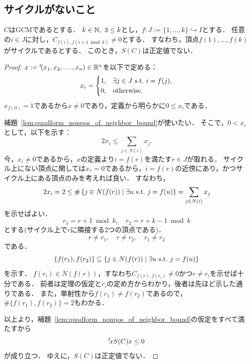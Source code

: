 \subsection{サイクルがないこと}

\begin{theorem}
  \label{thm:no_cycle}
  \leanok
  \uses{}
  $C$はGCMであるとする．
  $k \in \mathbb{N},\ 3 \le k$とし，$f : J := \{1, \ldots, k\} \hookrightarrow I$とする．
  任意の$i \in J$に対し，$C_{f(i), f(i+1 \bmod k)} \ne 0$とする．
  すなわち，頂点$f(1), \ldots, f(k)$がサイクルであるとする．
  このとき，$S(C)$は正定値でない．
\end{theorem}

\begin{proof}
  $x := {}^t\!(x_1, x_2, \ldots, x_n) \in \mathbb{R}^n$を以下で定める：
  \begin{equation}
    x_i = \begin{cases}
      1, & \exists j \in J \ \text{s.t.}\  i = f(j),\\
      0, & \textrm{otherwise}.
    \end{cases}
  \end{equation}
  $x_{f(0)} = 1$であるから$x \ne 0$であり，定義から明らかに$0 \le x_i$である．

  補題~\ref{lem:quadform_nonpos_of_neighbor_bound}が使いたい．
  そこで，$0 < x_i$として，以下を示す：
  \begin{equation}
    2 x_i \le \sum_{j \in N(i)} x_j.
  \end{equation}
  今，$x_i \ne 0$であるから，$x$の定義より$i = f(r)$を満たす$r \in J$が取れる．
  サイクル上にない頂点に関しては$x_* = 0$であるから，$i = f(r)$の近傍にあり，かつサイクル上にある頂点のみを考えれば良い．
  すなわち，
  \begin{equation}
    2 x_i
    = 2
    \le \#\left\lbrace j \in N(f(r)) \mathrel{} \middle| \mathrel{} \exists u \ \text{s.t.}\  j = f(u) \right\rbrace
    = \sum_{j \in N(i)} x_j
  \end{equation}
  を示せばよい．
  \begin{equation}
    r_1 = r + 1 \bmod k,\quad r_2 = r + k - 1 \bmod k
  \end{equation}
  とする(サイクル上で$r$に隣接する2つの頂点である)．
  \begin{equation}
    r \ne r_1,\quad r \ne r_2,\quad r_1 \ne r_2
  \end{equation}
  である．
  \begin{equation}
    \{f(r_1), f(r_2)\} \subseteq \left\lbrace j \in N(f(r)) \mathrel{} \middle| \mathrel{} \exists u \ \text{s.t.}\  j = f(u) \right\rbrace
  \end{equation}
  を示す．
  $f(r_i) \in N(f(r))$，すなわち$C_{f(r), f(r_i)} \ne 0$かつ$r \ne r_i$を示せば十分である．
  前者は定理の仮定と$r_i$の定め方からわかり，後者は先ほど示した通りである．
  また，単射性から$f(r_1) \ne f(r_2)$であるので，$\#\{f(r_1), f(r_2)\} = 2$もわかる．
  
  以上より，補題~\ref{lem:quadform_nonpos_of_neighbor_bound}の仮定をすべて満たすから
  \begin{equation}
    {}^t\!x S(C) x \le 0
  \end{equation}
  が成り立つ．
  ゆえに，$S(C)$は正定値でない．
\end{proof}
